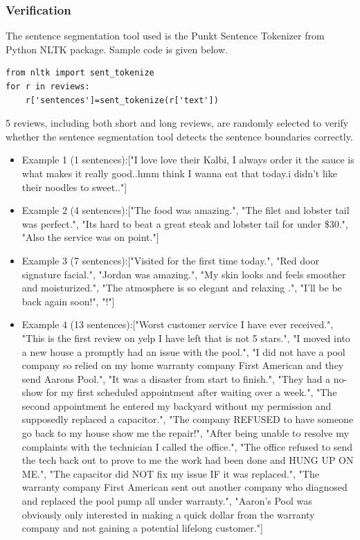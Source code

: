 \documentclass[sigconf]{acmart}
\begin{document}
\subsubsection{Verification} The sentence segmentation tool used is the Punkt Sentence Tokenizer from Python NLTK package. Sample code is given below.
\begin{verbatim}
from nltk import sent_tokenize
for r in reviews:
    r['sentences']=sent_tokenize(r['text'])
\end{verbatim}

5 reviews, including both short and long reviews, are randomly selected to verify whether the sentence segmentation tool detects the sentence boundaries correctly. 
\begin{itemize}
\item{Example 1 (1 sentences)}:["I love love their Kalbi, I always order it the sauce is what makes it really good..hmm think I wanna eat that today.i didn't like their noodles to sweet.."]
\item{Example 2 (4 sentences)}:["The food was amazing.", "The filet and lobster tail was perfect.", "Its hard to beat a great steak and lobster tail for under \$30.", "Also the service was on point."]
\item{Example 3 (7 sentences)}:["Visited for the first time today.", "Red door signature facial.", "Jordan was amazing.", "My skin looks and feels smoother and moisturized.", "The atmosphere is so elegant and relaxing .", "I'll be be back again soon!", "!"]
\item{Example 4 (13 sentences)}:["Worst customer service I have ever received.", "This is the first review on yelp I have left that is not 5 stars.", "I moved into a new house a promptly had an issue with the pool.", "I did not have a pool company so relied on my home warranty company First American and they send Aarons Pool.", "It was a disaster from start to finish.", "They had a no-show for my first scheduled appointment after waiting over a week.", "The second appointment he entered my backyard without my permission and supposedly replaced a capacitor.", "The company REFUSED to have someone go back to my house show me the repair!", "After being unable to resolve my complaints with the technician I called the office.", "The office refused to send the tech back out to prove to me the work had been done and HUNG UP ON ME.", "The capacitor did NOT fix my issue IF it was replaced.", "The warranty company First American sent out another company who diagnosed and replaced the pool pump all under warranty.", "Aaron's Pool was obviously only interested in making a quick dollar from the warranty company and not gaining a potential lifelong customer."]

\end{itemize}
\end{document}
